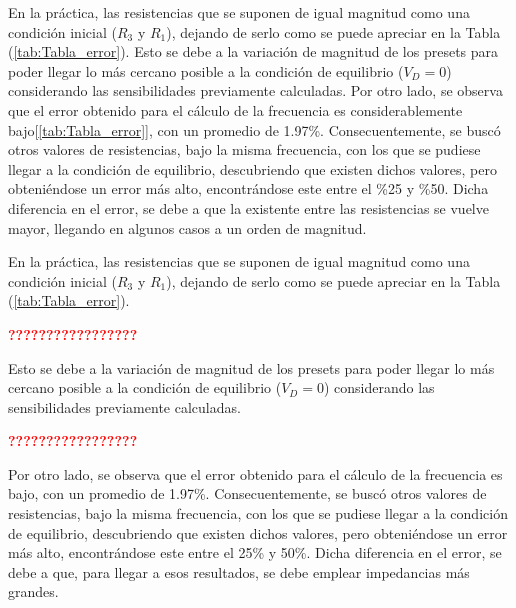 En la práctica, las resistencias que se suponen de igual magnitud como una condición inicial ($R_3$ y $R_1$), dejando de serlo como se puede apreciar en la Tabla (\ref{tab:Tabla_error}). Esto se debe a la variación de magnitud de los presets para poder llegar lo más cercano posible a la condición de equilibrio ($V_D=0$) considerando las sensibilidades previamente calculadas. 
Por otro lado, se observa que el error obtenido para el cálculo de la frecuencia es considerablemente bajo[\ref{tab:Tabla_error}], con un promedio de 1.97\%. Consecuentemente, se buscó otros valores de resistencias, bajo la misma frecuencia, con los que se pudiese llegar a la condición de equilibrio, descubriendo que existen dichos valores, pero obteniéndose un error más alto, encontrándose este entre el \%25 y \%50. Dicha diferencia en el error, se debe a que la existente entre las resistencias se vuelve mayor, llegando en algunos casos a un orden de magnitud. 

En la práctica, las resistencias que se suponen de igual magnitud como una condición inicial ($R_3$ y $R_1$), dejando de serlo como se puede apreciar en la Tabla (\ref{tab:Tabla_error}).
\begin{center}
	\huge{\textcolor{red}{\textbf{?????????????????}}}
\end{center}
Esto se debe a la variación de magnitud de los presets para poder llegar lo más cercano posible a la condición de equilibrio ($V_D=0$) considerando las sensibilidades previamente calculadas.
\begin{center}
	\huge{\textcolor{red}{\textbf{?????????????????}}}
\end{center}
Por otro lado, se observa que el error obtenido para el cálculo de la frecuencia es bajo, con un promedio de 1.97\%. Consecuentemente, se buscó otros valores de resistencias, bajo la misma frecuencia, con los que se pudiese llegar a la condición de equilibrio, descubriendo que existen dichos valores, pero obteniéndose un error más alto, encontrándose este entre el 25\% y 50\%. Dicha diferencia en el error, se debe a que, para llegar a esos resultados, se debe emplear impedancias más grandes.

